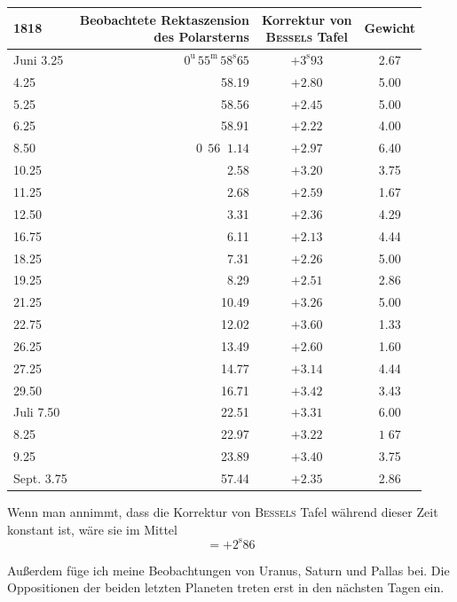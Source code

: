 \begin{center}
\begin{tabular}{l|r|c|c}
1818 & \shortstack{Beobachtete Rektaszension\\des Polarsterns} & \shortstack{Korrektur von\\\textsc{Bessels} Tafel} & Gewicht \\
\hline
Juni 3.25 & $0^{\mathrm u}\,55^{\mathrm m}\,58^{\mathrm s}65$ & $+3^{\mathrm s}93$ & 2.67 \\
4.25 & 58.19 & $+2.80$ & 5.00 \\
5.25 & 58.56 & $+2.45$ & 5.00 \\
6.25 & 58.91 & $+2.22$ & 4.00 \\
8.50 & $0\,\;56\;\;1.14$ & $+2.97$ & 6.40 \\
10.25 & 2.58 & $+3.20$ & 3.75 \\
11.25 & 2.68 & $+2.59$ & 1.67 \\
12.50 & 3.31 & $+2.36$ & 4.29 \\
16.75 & 6.11 & $+2.13$ & 4.44 \\
18.25 & 7.31 & $+2.26$ & 5.00 \\
19.25 & 8.29 & $+2.51$ & 2.86 \\
21.25 & 10.49 & $+3.26$ & 5.00 \\
22.75 & 12.02 & $+3.60$ & 1.33 \\
26.25 & 13.49 & $+2.60$ & 1.60 \\
27.25 & 14.77 & $+3.14$ & 4.44 \\
29.50 & 16.71 & $+3.42$ & 3.43 \\
Juli 7.50 & 22.51 & $+3.31$ & 6.00 \\
8.25 & 22.97 & $+3.22$ & $1\;67$ \\
9.25 & 23.89 & $+3.40$ & 3.75 \\
Sept. 3.75 & 57.44 & $+2.35$ & 2.86 \\
\end{tabular}
\end{center}

\par\indent Wenn man annimmt, dass die Korrektur von \textsc{Bessels} Tafel während dieser Zeit konstant ist, wäre sie im Mittel
\[
= +2^{\mathrm s}86
\]

\par\indent Außerdem füge ich meine Beobachtungen von Uranus, Saturn und Pallas bei. Die Oppositionen der beiden letzten Planeten treten erst in den nächsten Tagen ein.

